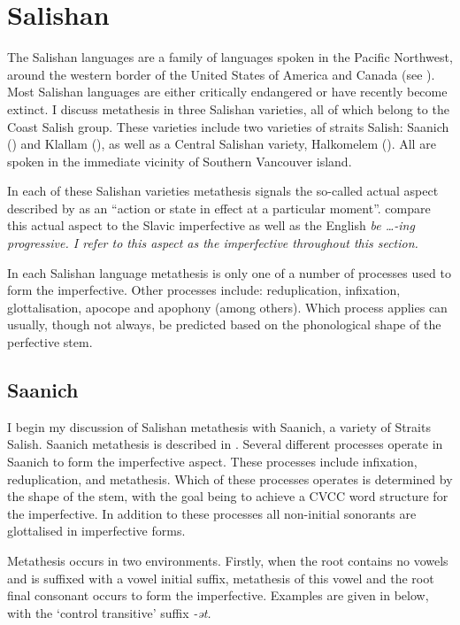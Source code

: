 \section{Salishan}\label{sec:Sal}
The Salishan languages are a family of languages spoken in the Pacific Northwest,
around the western border of the United States of America and Canada (see ).
Most Salishan languages are either critically endangered or have recently become extinct.
I discuss metathesis in three Salishan varieties, all of which belong to the Coast Salish group.
These varieties include two varieties of straits Salish:
Saanich () and Klallam (),
as well as a Central Salishan variety, Halkomelem ().
All are spoken in the immediate vicinity of Southern Vancouver island.

In each of these Salishan varieties metathesis signals the so-called
actual aspect described by \citeauthor[215]{thth69}
as an ``action or state in effect at a  particular moment''.
\citeauthor{thth69} compare this actual aspect to the Slavic imperfective
as well as the English \it{be {\ldots}-ing} progressive.
I refer to this aspect as the imperfective  throughout this section.

In each Salishan language metathesis is only one of a number of processes used to form the imperfective.
Other processes include: reduplication, infixation,
glottalisation, apocope and apophony (among others).
Which process applies can usually, though not always, be predicted based
on the phonological shape of the perfective stem.

\subsection{Saanich}\label{sec:Saa}
I begin my discussion of Salishan metathesis with Saanich,
a variety of Straits Salish.
Saanich metathesis is described in \cite{mo86,mo89}.
Several different processes operate in Saanich to form the imperfective aspect.
These processes include infixation, reduplication, and metathesis.
Which of these processes operates is determined by the shape of the stem,
with the goal being to achieve a CVCC word structure for the imperfective.
In addition to these processes
all non-initial sonorants are glottalised in imperfective forms.

Metathesis occurs in two environments.
Firstly, when the root contains no vowels
and is suffixed with a vowel initial suffix,
metathesis of this vowel and the root final consonant
occurs to form the imperfective.
Examples are given in  below,
with the `control transitive' suffix \it{-ət}.

